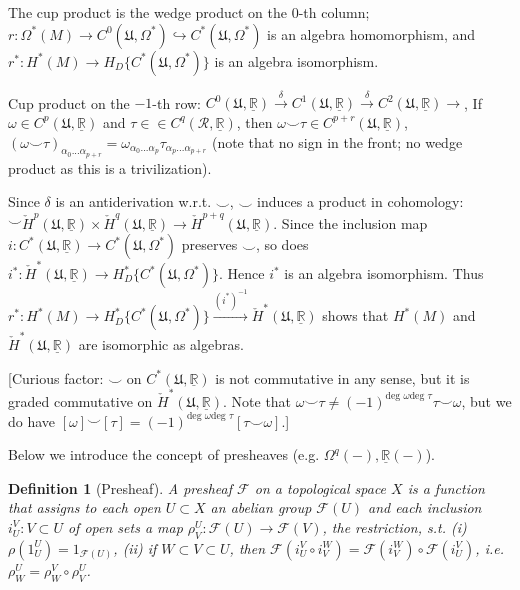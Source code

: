 \documentclass{article}
\theoremstyle{mystyle}
\newtheorem*{definition}{Definition}%
\theoremstyle{remark}
\numberwithin{equation}{section}
\begin{document}
The cup product is the wedge product on the $0$-th column; $r\colon \Omega^*(M)\rightarrow C^0(\mathfrak{U},\Omega^*)\hookrightarrow C^*(\mathfrak{U},\Omega^*)$ is an algebra homomorphism, and $r^*\colon H^*(M)\rightarrow H_D\{C^*(\mathfrak{U},\Omega^*)\}$ is an algebra isomorphism.

Cup product on the $-1$-th row: 
$C^0(\mathfrak{U},\underline{\mathbb{R}})
\xrightarrow{\delta}C^1(\mathfrak{U},\underline{\mathbb{R}})
\xrightarrow{\delta}C^2(\mathfrak{U},\underline{\mathbb{R}})
\rightarrow$, If $\omega \in C^p(\mathfrak{U},\underline{\mathbb{R}})$ and $\tau \in \in C^q(\mathcal{R},\underline{\mathbb{R}})$, then $\omega \smile \tau \in  C^{p+r}(\mathfrak{U},\underline{\mathbb{R}})$, $(\omega \smile \tau)_{\alpha_0...\alpha_{p+r}} = 
\omega_{\alpha_0...\alpha_p}\tau_{\alpha_p...\alpha_{p+r}}$ (note that no sign in the front; no wedge product as this is a trivilization).

Since $\delta$ is an antiderivation w.r.t. $\smile$, $\smile$ induces a product in cohomology: $\smile \check{H}^p(\mathfrak{U},\underline{\mathbb{R}})\times \check{H}^q(\mathfrak{U},\underline{\mathbb{R}})
\rightarrow \check{H}^{p+q}(\mathfrak{U},\underline{\mathbb{R}})$. Since the inclusion map $i\colon C^*(\mathfrak{U},\underline{\mathbb{R}})\rightarrow C^*(\mathfrak{U},\Omega^*)$ preserves $\smile$, so does $i^*\colon \check{H}^*(\mathfrak{U},\underline{\mathbb{R}})\rightarrow H^*_D\{C^*(\mathfrak{U},\Omega^*)\}$.  Hence $i^*$ is an algebra isomorphism. Thus $r^*\colon
H^*(M)\rightarrow H^*_D\{C^*(\mathfrak{U},\Omega^*)\}\xrightarrow{(i^*)^{-1}}
\check{H}^*(\mathfrak{U},\underline{\mathbb{R}})$ shows that $H^*(M)$ and $\check{H}^*(\mathfrak{U},\underline{\mathbb{R}})$ are isomorphic as algebras.

[Curious factor: $\smile$ on $C^*(\mathfrak{U},\underline{\mathbb{R}})$ is not commutative in any sense, but it is graded commutative on $\check{H}^*(\mathfrak{U},\underline{\mathbb{R}})$. Note that $\omega \smile \tau \neq (-1)^{\text{deg }\omega \text{deg }\tau} \tau \smile \omega$, but we do have $[\omega] \smile [\tau] = (-1)^{\text{deg }\omega \text{deg }\tau} [\tau \smile \omega]$.] 

Below we introduce the concept of presheaves (e.g. $\Omega^q(-),\underline{\mathbb{R}}(-)$).

\begin{definition}[Presheaf] A \emph{presheaf} $\mathcal{F}$ on a topological space $X$ is a function that assigns to each open $U\subset X$ an abelian group $\mathcal{F}(U)$ and each inclusion $i_U^V\colon V\subset U$ of open sets a map $\rho^U_V\colon \mathcal{F}(U)\rightarrow \mathcal{F}(V)$, the restriction, s.t. (i) $\rho(1^U_U) = 1_{\mathcal{F}(U)}$, (ii) if $W\subset V\subset U$, then $\mathcal{F}(i^V_U\circ i^W_V) = \mathcal{F}(i^W_V)\circ \mathcal{F}(i^V_U)$, i.e. $\rho^U_W = \rho^V_W\circ \rho^U_V$. 
\end{definition}
\end{document}
